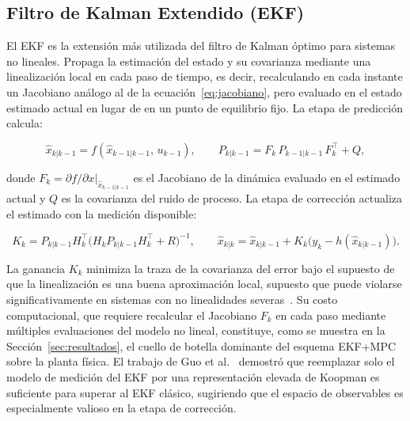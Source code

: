 \documentclass[12pt,letterpaper]{article}
\begin{document}
\subsection{Filtro de Kalman Extendido (EKF)}
\label{sec:ekf_marco}

El EKF es la extensión más utilizada del filtro de Kalman óptimo para sistemas no
lineales. Propaga la estimación del estado y su covarianza mediante una
linealización local en cada paso de tiempo, es decir, recalculando en cada instante
un Jacobiano análogo al de la ecuación~\eqref{eq:jacobiano}, pero evaluado en el
estado estimado actual en lugar de en un punto de equilibrio fijo. La etapa de
predicción calcula:

\begin{equation}
\hat{x}_{k|k-1} = f(\hat{x}_{k-1|k-1},\, u_{k-1}), \qquad
P_{k|k-1} = F_k\,P_{k-1|k-1}\,F_k^\top + Q,
\label{eq:ekf_pred}
\end{equation}

donde $F_k = \partial f/\partial x\big|_{\hat{x}_{k-1|k-1}}$ es el Jacobiano de la
dinámica evaluado en el estimado actual y $Q$ es la covarianza del ruido de proceso.
La etapa de corrección actualiza el estimado con la medición disponible:

\begin{equation}
K_k = P_{k|k-1}H_k^\top\bigl(H_kP_{k|k-1}H_k^\top + R\bigr)^{-1}, \qquad
\hat{x}_{k|k} = \hat{x}_{k|k-1} + K_k\bigl(y_k - h(\hat{x}_{k|k-1})\bigr).
\label{eq:ekf_corr}
\end{equation}

La ganancia $K_k$ minimiza la traza de la covarianza del error bajo el supuesto de
que la linealización es una buena aproximación local, supuesto que puede violarse
significativamente en sistemas con no linealidades severas~\cite{surana2016}. Su
costo computacional, que requiere recalcular el Jacobiano $F_k$ en cada paso mediante
múltiples evaluaciones del modelo no lineal, constituye, como se muestra en la
Sección~\ref{sec:resultados}, el cuello de botella dominante del esquema EKF+MPC
sobre la planta física. El trabajo de Guo et al.~\cite{kiloekf2026} demostró que
reemplazar solo el modelo de medición del EKF por una representación elevada de
Koopman es suficiente para superar al EKF clásico, sugiriendo que el espacio de
observables es especialmente valioso en la etapa de corrección.


\end{document}
